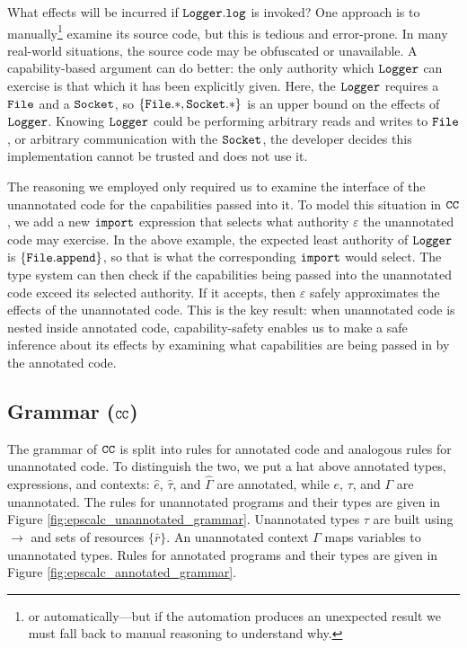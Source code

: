 What effects will be incurred if $\mathtt{Logger.log}$ is invoked? One
approach is to manually\footnote{or automatically---but if the
  automation produces an unexpected result we must fall back to manual
  reasoning to understand why.} examine its source code, but this is
tedious and error-prone. In many real-world situations, the source
code may be obfuscated or unavailable. A capability-based argument can
do better: the only authority which $\mathtt{Logger}$ can exercise is
that which it has been explicitly given. Here, the $\mathtt{Logger}$
requires a $\mathtt{File}$ and a $\mathtt{Socket}$, so
$\mathtt{ \{ \mathtt{File.*, Socket.*} \} }$ is an upper bound on the
effects of $\mathtt{Logger}$. Knowing $\mathtt{Logger}$ could be performing
arbitrary reads and writes to $\mathtt{File}$, or arbitrary communication
with the $\mathtt{Socket}$, the developer decides this implementation
cannot be trusted and does not use it.

The reasoning we employed only required us to examine the interface of
the unannotated code for the capabilities passed into it. To model
this situation in $\mathtt{CC}$, we add a new $\mathtt{import}$ expression
that selects what authority $\varepsilon$ the unannotated code may
exercise. In the above example, the expected least authority of
$\mathtt{Logger}$ is $\{ \mathtt{File.append} \}$, so that is what the
corresponding $\mathtt{import}$ would select. The type system can then
check if the capabilities being passed into the unannotated code
exceed its selected authority. If it accepts, then $\varepsilon$
safely approximates the effects of the unannotated code. This is the
key result: when unannotated code is nested inside annotated code,
capability-safety enables us to make a safe inference about its
effects by examining what capabilities are being passed in by the
annotated code.

\subsection{Grammar ($\mathtt{CC}$)}

The grammar of $\mathtt{CC}$ is split into rules for annotated code and
analogous rules for unannotated code. To distinguish the two, we put a
hat above annotated types, expressions, and contexts: $\hat e$,
$\hat \tau$, and $\hat \Gamma$ are annotated, while $e$, $\tau$, and
$\Gamma$ are unannotated. The rules for unannotated programs and their
types are given in Figure
\ref{fig:epscalc_unannotated_grammar}. Unannotated types $\tau$ are
built using $\rightarrow$ and sets of resources $\{ \bar r \}$. An
unannotated context $\Gamma$ maps variables to unannotated
types. Rules for annotated programs and their types are given in
Figure \ref{fig:epscalc_annotated_grammar}.

